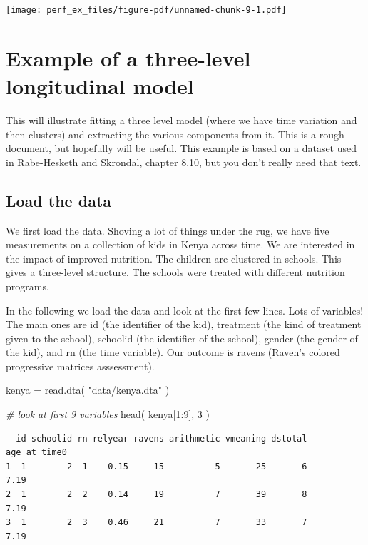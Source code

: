 \documentclass[
  letterpaper,
  DIV=11,
  numbers=noendperiod]{scrreprt}
\newenvironment{Shaded}{}{}
\newcommand{\CommentTok}[1]{\textcolor[rgb]{0.38,0.63,0.69}{\textit{#1}}}
\newcommand{\DecValTok}[1]{\textcolor[rgb]{0.25,0.63,0.44}{#1}}
\newcommand{\FunctionTok}[1]{\textcolor[rgb]{0.02,0.16,0.49}{#1}}
\newcommand{\NormalTok}[1]{#1}
\newcommand{\OtherTok}[1]{\textcolor[rgb]{0.00,0.44,0.13}{#1}}
\newcommand{\SpecialCharTok}[1]{\textcolor[rgb]{0.25,0.44,0.63}{#1}}
\newcommand{\StringTok}[1]{\textcolor[rgb]{0.25,0.44,0.63}{#1}}
\begin{document}
\texttt{[image: perf\_ex\_files/figure-pdf/unnamed-chunk-9-1.pdf]}

\chapter{Example of a three-level longitudinal
model}\label{example-of-a-three-level-longitudinal-model}

This will illustrate fitting a three level model (where we have time
variation and then clusters) and extracting the various components from
it. This is a rough document, but hopefully will be useful. This example
is based on a dataset used in Rabe-Hesketh and Skrondal, chapter 8.10,
but you don't really need that text.

\section{Load the data}\label{load-the-data-1}

We first load the data. Shoving a lot of things under the rug, we have
five measurements on a collection of kids in Kenya across time. We are
interested in the impact of improved nutrition. The children are
clustered in schools. This gives a three-level structure. The schools
were treated with different nutrition programs.

In the following we load the data and look at the first few lines. Lots
of variables! The main ones are id (the identifier of the kid),
treatment (the kind of treatment given to the school), schoolid (the
identifier of the school), gender (the gender of the kid), and rn (the
time variable). Our outcome is ravens (Raven's colored progressive
matrices asssessment).

\begin{Shaded}
\begin{Highlighting}[]
\NormalTok{kenya }\OtherTok{=} \FunctionTok{read.dta}\NormalTok{( }\StringTok{"data/kenya.dta"}\NormalTok{ )}

\CommentTok{\# look at first 9 variables}
\FunctionTok{head}\NormalTok{( kenya[}\DecValTok{1}\SpecialCharTok{:}\DecValTok{9}\NormalTok{], }\DecValTok{3}\NormalTok{ )}
\end{Highlighting}
\end{Shaded}

\begin{verbatim}
  id schoolid rn relyear ravens arithmetic vmeaning dstotal age_at_time0
1  1        2  1   -0.15     15          5       25       6         7.19
2  1        2  2    0.14     19          7       39       8         7.19
3  1        2  3    0.46     21          7       33       7         7.19
\end{verbatim}
\end{document}
